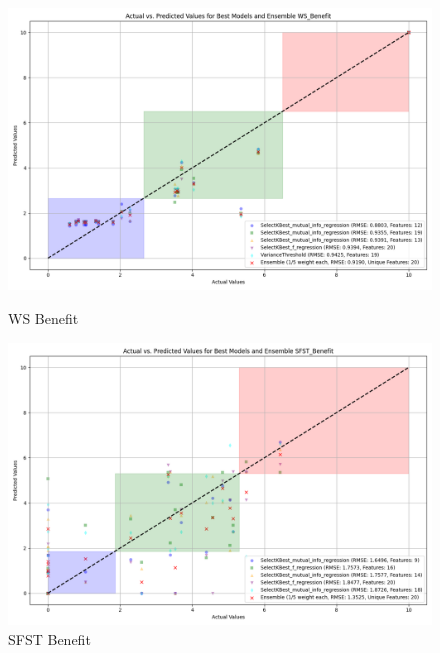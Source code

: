 \begin{figure}[H]
    \centering
    \begin{minipage}{0.45\textwidth}
        \centering
        \includegraphics[width=\linewidth]{reg_section_specxtra/images_reg_featred_ensemble/actual_vs_predicted_best_feature_selection_and_ensemble_WS_Benefit.png}
        \caption{WS Benefit}
        \label{fig_reg_specxtra:ws_ben_reg_featred_best_ensemble}
    \end{minipage}\hfill
    \begin{minipage}{0.45\textwidth}
        \centering
        \includegraphics[width=\linewidth]{reg_section_specxtra/images_reg_featred_ensemble/actual_vs_predicted_best_feature_selection_and_ensemble_SFST_Benefit.png}
        \caption{SFST Benefit}
        \label{fig_reg_specxtra:sfst_ben_reg_featred_best_ensemble}
    \end{minipage}
\end{figure}

